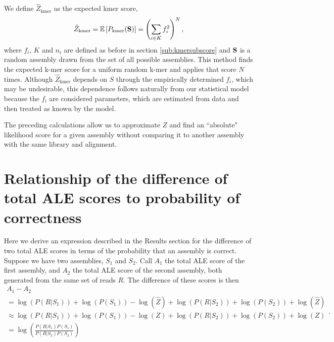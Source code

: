 \documentclass[phd,tocprelim]{cornell}
\begin{document}
We define $\hat{Z}_{\text{kmer}}$ as the expected kmer score,
\begin{equation}
    \hat{Z}_{\text{kmer}} = \mathbb{E}\left[P_{\text{kmer}}({\bf S})\right] = \left(\sum_{i\in K} f_{i}^{2}\right)^{N},
\end{equation}
where $f_{i}$, $K$ and $n_{i}$ are defined as before in section \ref{sub:kmersubscore} and ${\bf S}$ is a random assembly drawn from the set of all possible assemblies. This method finds the expected k-mer score for a uniform random k-mer and applies that score $N$ times. Although $\hat{Z}_{\text{kmer}}$ depends on $S$ through the empirically determined $f_{i}$, which may be undesirable, this dependence follows naturally from our statistical model because the $f_{i}$ are considered parameters, which are estimated from data and then treated as known by the model. 


The preceding calculations allow us to approximate $Z$ and find an ``absolute" likelihood score for a given assembly without comparing it to another assembly with the same library and alignment.


\section{Relationship of the difference of total ALE scores to probability of correctness} %
\label{sec:Relationship of the difference of total ALE scores to probability of correctness}

Here we derive an expression described in the Results section for the difference of two total ALE scores in terms of the probability that an assembly is correct.  Suppose we have two assemblies, $S_{1}$ and $S_{2}$.  Call $A_{1}$ the total ALE score of the first assembly, and $A_{2}$ the total ALE score of the second assembly, both generated from the same set of reads $R$. The difference of these scores is then
\begin{equation}
    \begin{array}{l}
        A_{1} - A_{2} \\
        = \log\left(P\left(R|S_{1}\right)\right) + \log\left(P\left(S_{1}\right)\right) - \log\left(\hat{Z}\right) + \log\left(P\left(R|S_{2}\right)\right) + \log\left(P\left(S_{2}\right)\right) + \log\left(\hat{Z}\right) \\
        \approx \log\left(P\left(R|S_{1}\right)\right) + \log\left(P\left(S_{1}\right)\right) - \log\left(Z\right) + \log\left(P\left(R|S_{2}\right)\right) + \log\left(P\left(S_{2}\right)\right) + \log\left(Z\right) \\
        = \log\left(\frac{P\left(R|S_{1}\right)P\left(S_{1}\right)}{P\left(R|S_{2}\right)P\left(S_{2}\right)}\right)
    \end{array}.
\end{equation}
\end{document}
